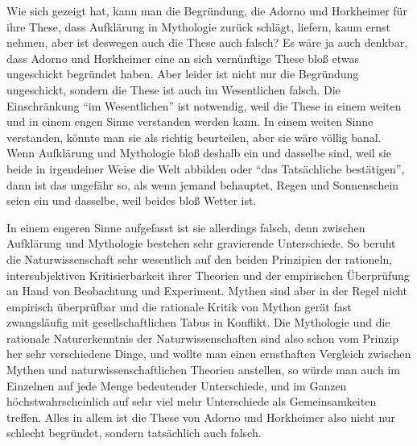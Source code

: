 \documentclass[12pt,a4paper,ngerman]{article}
\begin{document}
Wie sich gezeigt hat, kann man die Begründung, die Adorno und
Horkheimer für ihre These, dass Aufklärung in Mythologie zurück
schlägt, liefern, kaum ernst nehmen, aber ist deswegen auch die These
auch falsch? Es wäre ja auch denkbar, dass Adorno und Horkheimer eine
an sich vernünftige These bloß etwas ungeschickt begründet haben. Aber
leider ist nicht nur die Begründung ungeschickt, sondern die These ist
auch im Wesentlichen falsch. Die Einschränkung "`im Wesentlichen"' ist
notwendig, weil die These in einem weiten und in einem engen Sinne
verstanden werden kann. In einem weiten Sinne verstanden, könnte man
sie als richtig beurteilen, aber sie wäre völlig banal. Wenn
Aufklärung und Mythologie bloß deshalb ein und dasselbe sind, weil sie
beide in irgendeiner Weise die Welt abbilden oder "`das Tatsächliche
bestätigen"', dann ist das ungefähr so, als wenn jemand behauptet,
Regen und Sonnenschein seien ein und dasselbe, weil beides bloß
Wetter ist. 

In einem engeren Sinne aufgefasst ist sie allerdings
falsch, denn zwischen Aufklärung und Mythologie bestehen sehr
gravierende Unterschiede. So beruht die Naturwissenschaft sehr
wesentlich auf den beiden Prinzipien der rationeln, intersubjektiven
Kritisierbarkeit ihrer Theorien und der empirischen Überprüfung an
Hand von Beobachtung und Experiment. Mythen sind aber in der Regel
nicht empirisch überprüfbar und die rationale Kritik von Mython gerät
fast zwangsläufig mit gesellschaftlichen Tabus in Konflikt. Die
Mythologie und die rationale Naturerkenntnis der Naturwissenschaften
sind also schon vom Prinzip her sehr verschiedene Dinge, und wollte
man einen ernsthaften Vergleich zwischen Mythen und
naturwissenschaftlichen Theorien anstellen, so würde man auch im
Einzelnen auf jede Menge bedeutender Unterschiede, und im Ganzen
höchstwahrscheinlich auf sehr viel mehr Unterschiede als
Gemeinsamkeiten treffen. Alles in allem ist die These von Adorno und
Horkheimer also nicht nur schlecht begründet, sondern tatsächlich auch
falsch.
\end{document}
